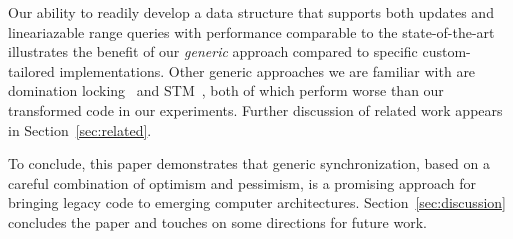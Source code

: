 Our ability to readily develop a data structure that supports both updates and lineariazable range queries with 
performance comparable to the state-of-the-art illustrates the benefit of 
our \emph{generic} approach compared to specific custom-tailored implementations.
%
Other generic approaches we are familiar with are domination locking~\cite{Gueta2011} and STM~\cite{DiceSS2006}, both of which perform worse than our transformed code in our experiments. 
%
Further discussion of related work appears in Section~\ref{sec:related}.

To conclude, this paper demonstrates that generic synchronization, based on a careful combination of optimism and
pessimism, 
is a promising approach for bringing legacy code to emerging computer architectures.
Section~\ref{sec:discussion} concludes the paper and touches on some directions for future work. 